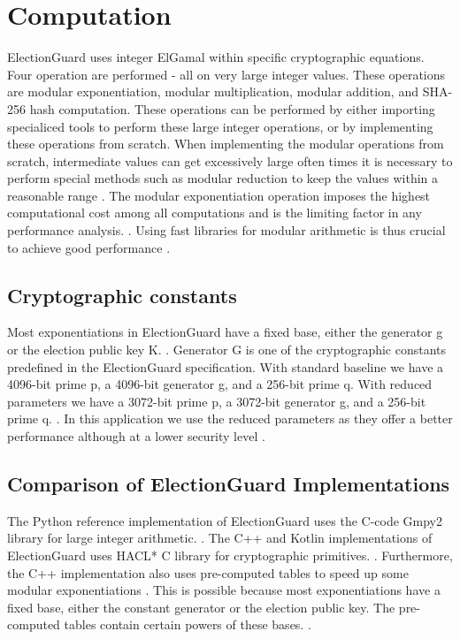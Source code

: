 \section{Computation}
ElectionGuard uses integer ElGamal within specific cryptographic equations. Four operation are performed - all on very large integer values. These operations are modular exponentiation, modular multiplication, modular addition, and SHA-256 hash computation. These operations can be performed by either importing specialiced tools to perform these large integer operations, or by implementing these operations from scratch. When implementing the modular operations from scratch, intermediate values can get excessively large often times it is necessary to perform special methods such as modular reduction to keep the values within a reasonable range \cite[21, 25-26]{eg-spec}. The modular exponentiation operation imposes the highest computational cost among all computations and is the limiting factor in any performance analysis. \cite[22]{eg-spec}. Using fast libraries for modular arithmetic is thus crucial to achieve good performance \cite[22]{eg-paper}.

\subsection{Cryptographic constants}
Most exponentiations in ElectionGuard have a fixed base, either the generator g or the election public key K. \cite[22]{eg-paper}. Generator G is one of the cryptographic constants predefined in the ElectionGuard specification. With standard baseline we have a 4096-bit prime p, a 4096-bit generator g, and a 256-bit prime q. With reduced parameters we have a 3072-bit prime p, a 3072-bit generator g, and a 256-bit prime q. \cite[21-23]{eg-spec}. In this application we use the reduced parameters as they offer a better performance although at a lower security level \cite[36-37]{eg-spec}.


\subsection{Comparison of ElectionGuard Implementations}
 The Python reference implementation of ElectionGuard uses the C-code Gmpy2 library for large integer arithmetic. \cite{eg-docs}. \cite{esp32-ref} The C++ and Kotlin implementations of ElectionGuard uses HACL* C library for cryptographic primitives. \cite{eg-docs}. Furthermore, the C++ implementation also uses pre-computed tables to speed up some modular exponentiations \cite{eg-docs}. This is possible because most exponentiations have a fixed base, either the constant generator or the election public key. The pre-computed tables contain certain powers of these bases. \cite{eg-docs}.

